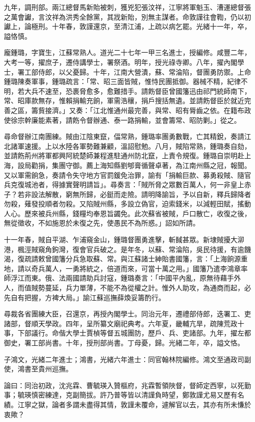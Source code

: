 \begin{pinyinscope}
九年，調刑部。兩江總督馬新貽被刺，獲兇犯張汶祥，江寧將軍魁玉、漕運總督張之萬會讞，言汶祥為洪秀全餘黨，其戕新貽，別無主謀者。命敦謹往會鞫，仍以初讞上，論極刑。十年春，敦謹還京，至清江浦，上疏以病乞罷。光緒十一年，卒，謚恪慎。

龐鍾璐，字寶生，江蘇常熟人。道光二十七年一甲三名進士，授編修。咸豐二年，大考一等，擢庶子，遷侍講學士，署祭酒。明年，授光祿寺卿。八年，擢內閣學士，署工部侍郎，以父憂歸。十年，江南大營潰，蘇、常淪陷，督團勇防禦。上命鍾璐陳奏軍事，鍾璐疏言：「常、昭三面皆賊，惟恃民團抵御。器械不精，紀律不明，若大兵不速至，恐裹脅愈多，愈難措手。請飭督臣曾國籓迅由祁門統師南下，常、昭庫款無存，惟賴捐輸充餉，軍需浩穰，捐戶搜括無遺。並請飭督臣於就近完善之區，籌貲接濟。」又奏：「江北惟通州最完善，與常、昭有脣齒之依。在籍布政使徐宗幹廉能素著，請飭令督辦通、泰一路捐輸，並會籌常、昭防剿。」從之。

尋命督辦江南團練。賊由江陰東竄，偪常熟，鍾璐率團勇數戰，亡其精銳，奏請江北諸軍速援。上以水陸各軍勢難兼顧，溫詔慰勉。八月，賊陷常熟，鍾璐奏自劾，並請飭荊州將軍都興阿統楚師兼程進駐通州防北竄，上責令規復。鍾璐自崇明赴上海，設局勸捐，集團守御。薦上海知縣劉郇膏循聲卓著，為江南州縣之冠，報聞。又以軍需餉急，奏請令失守地方官罰鍰免治罪，諭有「捐輸巨款、募勇殺賊、隨官兵克復城池者，得據實聲明請旨」。尋奏言：「賊所脅之眾數百萬人，何一非皇上赤子？若非設法解散，窮無所歸，必鋌而走險。請明降諭旨，予以自新，釋兵歸降者勿殺，薙發投順者勿殺。又陷賊州縣，多設立偽官，迫索錢米，以減輕田賦，搖動人心。歷來被兵州縣，錢糧均奉恩旨蠲免。此次蘇省被賊，戶口散亡，收復之後，無從徵收，不如施恩於未復之先，使愚民不為所惑。」詔如所請。

十一年春，賊自平湖、乍浦窺金山，鍾璐督團勇進擊，斬馘甚眾。新埭賊擾大泖港，楓涇賊窺角鉤灣，復會官兵破之。是年冬，以蘇、常淪陷，吳民待援，有逾饑渴，復疏請敕曾國籓分兵急取蘇、常。與江蘇諸士紳貽書國籓，言：「上海餉源重地，請以奇兵萬人，一勇將統之，倍道而來，可當十萬之用。」國籓乃遣李鴻章率師浮江而東。俄、法兩國請助兵討寇，鍾璐奏言：「中國平內亂，原無待藉手外人，而值賊勢蔓延，兵力單薄，不能不為從權之計。惟外人助攻，為通商而起，必先自有把握，方裨大局。」諭江蘇巡撫薛煥妥籌酌行。

尋裁各省團練大臣，召還京，再授內閣學士。同治元年，遷禮部侍郎，迭署工、吏諸部，督順天學政。四年，呈所纂文廟祀典考。六年夏，畿輔亢旱，疏陳荒政十事，下部議行。命偕大學士賈楨等督五城團防，歷戶、兵、吏諸部。九年，擢左都御史，署工部尚書。十年，授刑部尚書。丁母憂，歸。光緒二年，卒，謚文恪。

子鴻文，光緒二年進士；鴻書，光緒六年進士：同官翰林院編修。鴻文至通政司副使，鴻書至貴州巡撫。

論曰：同治初政，沈兆霖、曹毓瑛入贊樞府，兆霖暫領陜督，督師定西寧，以死勤事；毓瑛慎密練達，克副簡拔。許乃普等皆以清謹負時望，鄭敦謹尤易又歷有名績。江寧之獄，論者多謂未盡得其情，敦謹未覆命，遽解官以去，其亦有所未慊於衷歟？


\end{pinyinscope}